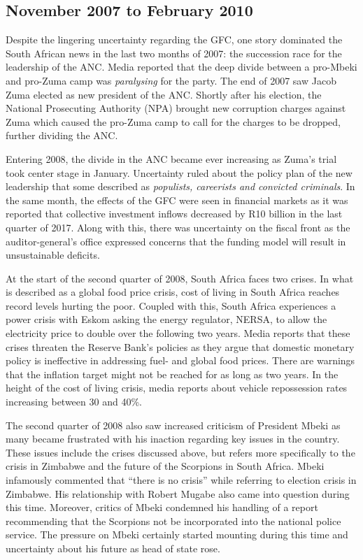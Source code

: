 \documentclass[11pt,preprint, authoryear]{elsarticle}
\numberwithin{equation}{section}
\numberwithin{figure}{section}
\numberwithin{table}{section}
\begin{document}
\subsection{November 2007 to February
2010}\label{november-2007-to-february-2010}

Despite the lingering uncertainty regarding the GFC, one story dominated
the South African news in the last two months of 2007: the succession
race for the leadership of the ANC. Media reported that the deep divide
between a pro-Mbeki and pro-Zuma camp was \emph{paralysing} for the
party. The end of 2007 saw Jacob Zuma elected as new president of the
ANC. Shortly after his election, the National Prosecuting Authority
(NPA) brought new corruption charges against Zuma which caused the
pro-Zuma camp to call for the charges to be dropped, further dividing
the ANC.

Entering 2008, the divide in the ANC became ever increasing as Zuma's
trial took center stage in January. Uncertainty ruled about the policy
plan of the new leadership that some described as
\emph{populists, careerists and convicted criminals}. In the same month,
the effects of the GFC were seen in financial markets as it was reported
that collective investment inflows decreased by R10 billion in the last
quarter of 2017. Along with this, there was uncertainty on the fiscal
front as the auditor-general's office expressed concerns that the
funding model will result in unsustainable deficits.

At the start of the second quarter of 2008, South Africa faces two
crises. In what is described as a global food price crisis, cost of
living in South Africa reaches record levels hurting the poor. Coupled
with this, South Africa experiences a power crisis with Eskom asking the
energy regulator, NERSA, to allow the electricity price to double over
the following two years. Media reports that these crises threaten the
Reserve Bank's policies as they argue that domestic monetary policy is
ineffective in addressing fuel- and global food prices. There are
warnings that the inflation target might not be reached for as long as
two years. In the height of the cost of living crisis, media reports
about vehicle repossession rates increasing between 30 and 40\%.

The second quarter of 2008 also saw increased criticism of President
Mbeki as many became frustrated with his inaction regarding key issues
in the country. These issues include the crises discussed above, but
refers more specifically to the crisis in Zimbabwe and the future of the
Scorpions in South Africa. Mbeki infamously commented that ``there is no
crisis'' while referring to election crisis in Zimbabwe. His
relationship with Robert Mugabe also came into question during this
time. Moreover, critics of Mbeki condemned his handling of a report
recommending that the Scorpions not be incorporated into the national
police service. The pressure on Mbeki certainly started mounting during
this time and uncertainty about his future as head of state rose.
\end{document}

